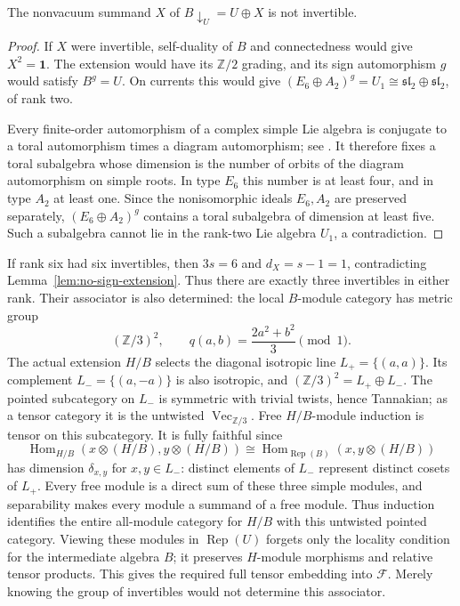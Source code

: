 \begin{lemma}\label{lem:no-sign-extension}
The nonvacuum summand $X$ of $B\downarrow_U=U\oplus X$ is not
invertible.
\end{lemma}
\begin{proof}
If $X$ were invertible, self-duality of $B$ and connectedness would
give $X^2=\mathbf1$. The extension would have its $\mathbb Z/2$
grading, and its sign automorphism $g$ would satisfy $B^g=U$.
On currents this would give
$(E_6\oplus A_2)^g=U_1\cong\mathfrak{sl}_2\oplus\mathfrak{sl}_2$,
of rank two.

Every finite-order automorphism of a complex simple Lie algebra is
conjugate to a toral automorphism times a diagram automorphism;
see \cite[Section~5.2]{RLYG}. It therefore fixes a toral subalgebra
whose dimension is the number of orbits of the diagram automorphism
on simple roots. In type $E_6$ this number is at least four, and in
type $A_2$ at least one. Since the nonisomorphic ideals $E_6,A_2$
are preserved separately, $(E_6\oplus A_2)^g$ contains a toral
subalgebra of dimension at least five. Such a subalgebra cannot lie
in the rank-two Lie algebra $U_1$, a contradiction.
\end{proof}

If rank six had six invertibles, then $3s=6$ and
$d_X=s-1=1$, contradicting Lemma~\ref{lem:no-sign-extension}.
Thus there are
exactly three invertibles in either rank. Their associator is also
determined: the local $B$-module category has metric group
\[
 (\mathbb Z/3)^2,\qquad q(a,b)=\frac{2a^2+b^2}{3}\pmod1.
\]
The actual extension $H/B$ selects the diagonal isotropic line
$L_+=\{(a,a)\}$. Its complement
$L_-=\{(a,-a)\}$ is also isotropic, and
$(\mathbb Z/3)^2=L_+\oplus L_-$.
The pointed subcategory on $L_-$ is symmetric with trivial twists,
hence Tannakian; as a tensor category it is the untwisted
$\operatorname{Vec}_{\mathbb Z/3}$. Free $H/B$-module induction is
tensor on this subcategory. It is fully faithful since
\[
 \operatorname{Hom}_{H/B}(x\otimes(H/B),y\otimes(H/B))
 \cong\operatorname{Hom}_{\operatorname{Rep}(B)}
       (x,y\otimes(H/B))
\]
has dimension $\delta_{x,y}$ for $x,y\in L_-$: distinct elements of
$L_-$ represent distinct cosets of $L_+$. Every free module is a
direct sum of these three simple modules, and separability makes
every module a summand of a free module. Thus induction identifies the entire
all-module category for $H/B$ with this untwisted pointed category.
Viewing these modules in $\operatorname{Rep}(U)$ forgets only the
locality condition for the intermediate algebra $B$; it preserves
$H$-module morphisms and relative tensor products. This gives the
required full tensor embedding into $\mathcal F$.
Merely knowing the group of invertibles would not determine this
associator.

